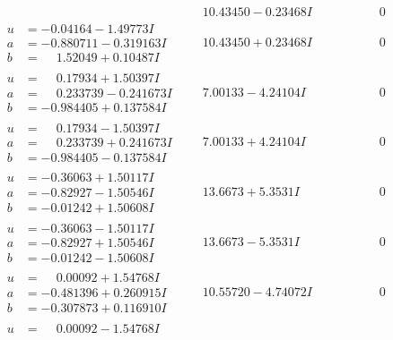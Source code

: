 \documentclass[1p]{elsarticle_modified}
\theoremstyle{definition}
\begin{document}
$$\begin{array}{c|c|c}
 & \phantom{-}10.43450 - 0.23468 I & \phantom{-0.000000 } 0 \\ \hline\begin{aligned}
u &= -0.04164 - 1.49773 I \\
a &= -0.880711 - 0.319163 I \\
b &= \phantom{-}1.52049 + 0.10487 I\end{aligned}
 & \phantom{-}10.43450 + 0.23468 I & \phantom{-0.000000 } 0 \\ \hline\begin{aligned}
u &= \phantom{-}0.17934 + 1.50397 I \\
a &= \phantom{-}0.233739 - 0.241673 I \\
b &= -0.984405 + 0.137584 I\end{aligned}
 & \phantom{-}7.00133 - 4.24104 I & \phantom{-0.000000 } 0 \\ \hline\begin{aligned}
u &= \phantom{-}0.17934 - 1.50397 I \\
a &= \phantom{-}0.233739 + 0.241673 I \\
b &= -0.984405 - 0.137584 I\end{aligned}
 & \phantom{-}7.00133 + 4.24104 I & \phantom{-0.000000 } 0 \\ \hline\begin{aligned}
u &= -0.36063 + 1.50117 I \\
a &= -0.82927 - 1.50546 I \\
b &= -0.01242 + 1.50608 I\end{aligned}
 & \phantom{-}13.6673 + 5.3531 I & \phantom{-0.000000 } 0 \\ \hline\begin{aligned}
u &= -0.36063 - 1.50117 I \\
a &= -0.82927 + 1.50546 I \\
b &= -0.01242 - 1.50608 I\end{aligned}
 & \phantom{-}13.6673 - 5.3531 I & \phantom{-0.000000 } 0 \\ \hline\begin{aligned}
u &= \phantom{-}0.00092 + 1.54768 I \\
a &= -0.481396 + 0.260915 I \\
b &= -0.307873 + 0.116910 I\end{aligned}
 & \phantom{-}10.55720 - 4.74072 I & \phantom{-0.000000 } 0 \\ \hline\begin{aligned}
u &= \phantom{-}0.00092 - 1.54768 I \\

\end{aligned}
\end{array}$$
\end{document}
